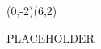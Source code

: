 \documentclass{report}
\begin{document}
\begin{VCPicture}{(0,-2)(6,2)}
  
  PLACEHOLDER
 
   

   
  
\end{VCPicture}
\end{document}
